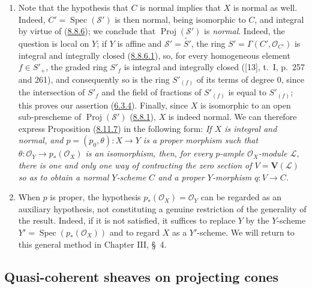 \begin{remark}[8.11.8]
\label{II.8.11.8}
\begin{enumerate}
  \item[\rm{(i)}] Note that the hypothesis that $C$ is normal implies that
  $X$ is normal as well. Indeed, $C'=\operatorname{Spec}(\mathcal{S}')$ is
  then normal, being isomorphic to $C$, and integral by virtue of
  (\hyperref[II.8.8.6]{8.8.6}); we conclude that
  $\operatorname{Proj}(\mathcal{S}')$ is \emph{normal}. Indeed, the question
  is local on $Y$; if $Y$ is affine and $\mathcal{S}'=\widetilde{S'}$,
  the ring $S'=\Gamma(C',\mathcal{O}_{C'})$ is integral and integrally closed
  (\hyperref[II.8.8.6.1]{8.8.6.1}), so, for every homogeneous element
  $f\in S'_+$, the graded ring $S'_f$ is integral and integrally closed
  ([13], t.~I, p.~257 and 261), and consequently so is the ring $S'_{(f)}$
  of its terms of degree 0, since the intersection of $S'_f$ and the field
  of fractions of $S'_{(f)}$ is equal to $S'_{(f)}$; this proves our
  assertion (\hyperref[II.6.3.4]{6.3.4}). Finally, since $X$ is isomorphic
  to an open sub-prescheme of $\operatorname{Proj}(\mathcal{S}')$
  (\hyperref[II.8.8.1]{8.8.1}), $X$ is indeed normal. We can therefore
  express Proposition (\hyperref[II.8.11.7]{8.11.7}) in the following form:
  \emph{If $X$ is integral and normal, and
  $p=(p_0,\theta):X\to Y$ is a proper morphism such that
  $\theta:\mathcal{O}_Y\to p_*(\mathcal{O}_X)$ is an isomorphism, then,
  for every $p$-ample $\mathcal{O}_X$-module $\mathcal{L}$, there is one
  and only one way of contracting the zero section of
  $V=\mathbf{V}(\mathcal{L})$ so as to obtain a normal $Y$-scheme $C$ and
  a proper $Y$-morphism $q:V\to C$.}
  \item[\rm{(ii)}] When $p$ is proper, the hypothesis
  $p_*(\mathcal{O}_X)=\mathcal{O}_Y$ can be regarded as an auxiliary
  hypothesis, not constituting a genuine restriction of the generality of the
  result. Indeed, if it is not satisfied, it suffices to replace $Y$
  by the $Y$-scheme
  $Y'=\operatorname{Spec}(p_*(\mathcal{O}_X))$ and to regard $X$ as a
  $Y'$-scheme. We will return to this general method in Chapter III,
  \S~4.
\end{enumerate}
\end{remark}


\subsection{Quasi-coherent sheaves on projecting cones}
\label{subsection:II.8.12}

